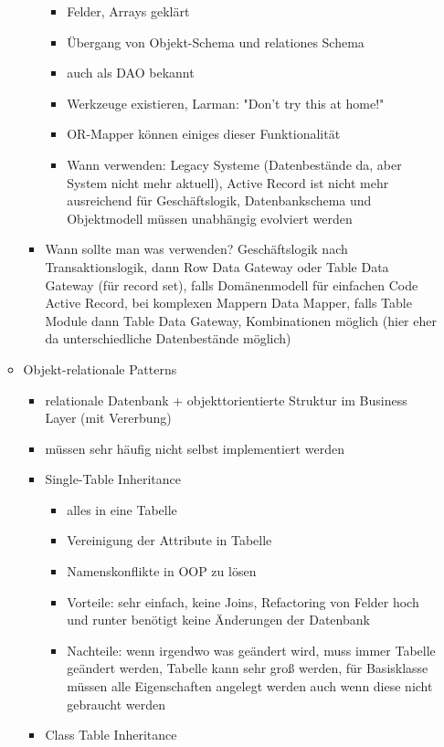 \documentclass[paper=a4, fontsize=11pt]{scrartcl} %
\numberwithin{equation}{section} %
\numberwithin{figure}{section} %
\numberwithin{table}{section} %
\begin{document}
\begin{itemize}
\begin{itemize}
\begin{itemize}
\begin{itemize}
        \item Felder, Arrays geklärt
        \item Übergang von Objekt-Schema und relationes Schema
        \item auch als DAO bekannt
        \item Werkzeuge existieren, Larman: "Don't try this at home!"
        \item OR-Mapper können einiges dieser Funktionalität
        \item Wann verwenden: Legacy Systeme (Datenbestände da, aber System nicht mehr aktuell), Active Record ist nicht mehr ausreichend für Geschäftslogik, Datenbankschema und Objektmodell müssen unabhängig evolviert werden
      \end{itemize}
      \item Wann sollte man was verwenden? Geschäftslogik nach Transaktionslogik, dann Row Data Gateway oder Table Data Gateway (für record set), falls Domänenmodell für einfachen Code Active Record, bei komplexen Mappern Data Mapper, falls Table Module dann Table Data Gateway, Kombinationen möglich (hier eher da unterschiedliche Datenbestände möglich)
    \end{itemize}
    \item Objekt-relationale Patterns
    \begin{itemize}
      \item relationale Datenbank + objekttorientierte Struktur im Business Layer (mit Vererbung)
      \item müssen sehr häufig nicht selbst implementiert werden
      \item Single-Table Inheritance
      \begin{itemize}
        \item alles in eine Tabelle
        \item Vereinigung der Attribute in Tabelle
        \item Namenskonflikte in OOP zu lösen
        \item Vorteile: sehr einfach, keine Joins, Refactoring von Felder hoch und runter benötigt keine Änderungen der Datenbank
        \item Nachteile: wenn irgendwo was geändert wird, muss immer Tabelle geändert werden, Tabelle kann sehr groß werden, für Basisklasse müssen alle Eigenschaften angelegt werden auch wenn diese nicht gebraucht werden
      \end{itemize}
      \item Class Table Inheritance
      \begin{itemize}

\end{itemize}
\end{itemize}
\end{itemize}
\end{itemize}
\end{document}
